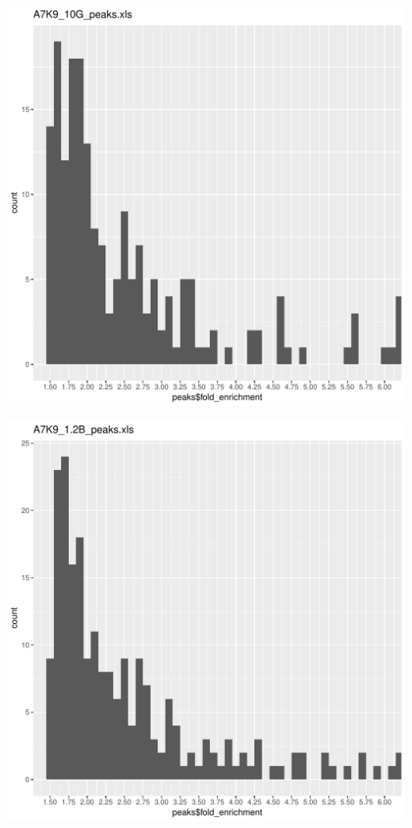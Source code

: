 \documentclass{article}\usepackage[]{graphicx}\usepackage[]{color}
\makeatletter
\def\maxwidth{ %
  \ifdim\Gin@nat@width>\linewidth
    \linewidth
  \else
    \Gin@nat@width
  \fi
}
\newenvironment{knitrout}{}{} %
\makeatother
\begin{document}
\begin{knitrout}
\includegraphics[width=\maxwidth]{figure/unnamed-chunk-2-10} 

\includegraphics[width=\maxwidth]{figure/unnamed-chunk-2-11} 


\end{knitrout}
\end{document}
